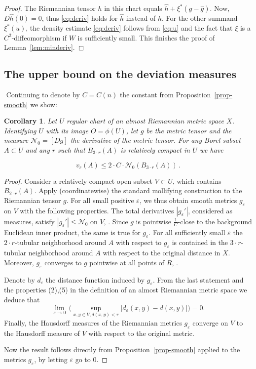 \documentclass[12pt,leqno,intlimits]{amsart}
\numberwithin{equation}{section}
\newtheorem{cor}[thm]{Corollary}
\theoremstyle{definition}
\theoremstyle{remark}
\newcommand{\pref}[1]{Proposition~\ref{#1}}
\newcommand{\lref}[1]{Lemma~\ref{#1}}
\begin{document}
\begin{proof}
The Riemannian tensor $h$ in this chart equals $\hat h +\xi^{\ast } (g-\hat g)$.
Now, $D\hat h (0) =0$, thus
\eqref{eq:deriv} holds for $\hat h$ instead of $h$. For the other summand $\xi ^{\ast} (u)$, the density estimate
\eqref{eq:deriv} follows from \eqref{eq:u} and the fact that $\xi$ is a $C^2$-diffeomorphism
if $W$ is sufficiently small. This finishes the proof of \lref{lem:minderiv}.
\end{proof}


\subsection{The upper bound on the deviation measures}
$ $
%
Continuing to denote by $C=C(n)$ the constant from Proposition~\ref{prop-smooth} we show:

\begin{cor} \label{cor-dc-vr}
Let $U$ regular chart of an almost Riemannian metric space $X$. Identifying $U$ with its image $O=\phi (U)$, let
$g$ be the metric tensor and the measure $\mathcal N_0 =[Dg]$ the derivative of the metric tensor. For any Borel subset $A\subset U$ and any $r$
such that $B_{3{\cdot}r} (A)$ is relatively compact in $U$ we have

\[
v_r (A) \leq 2 \cdot C \cdot \mathcal N_0 (B_{3{\cdot}r} (A))\, .
\]
\end{cor}

\begin{proof}
Consider a relatively compact open subset $ V \subset U$, which contains $B_{2{\cdot}r} (A)$. Apply (coordinatewise) the standard mollifying construction
to the Riemannian tensor $g$. For all small positive $\varepsilon$, we thus obtain smooth metrics $g_{\varepsilon}$ on $V$ with the following properties.
The total derivatives $|g_{\varepsilon} '|$, considered as measures, satisfy $|g_{\varepsilon} '|\leq \mathcal N_0$ on $V$, \cite[Theorem 5.3.1]{Ziemer}. Since $g$ is pointwise $\frac 1 C$-close to the background Euclidean inner product, the same is true for $g_{\varepsilon}$. For all sufficiently small $\varepsilon$ the $2{\cdot}r$-tubular neighborhood around $A$ with respect to $g_{\varepsilon}$ is contained in the $3{\cdot}r$-tubular neighborhood around $A$ with respect to the original distance in $X$. Moreover, $g_{\varepsilon}$ converges to $g$ pointwise at all points of $R$, \cite[Theorem 1.6.1]{Ziemer}.

Denote by $d_{\varepsilon}$ the distance function induced by $g_{\varepsilon}$. From the last statement and the properties (2),(5) in the definition of an almost Riemannian metric space we deduce that
\[
\lim _{\varepsilon \to 0}\, \Big (\sup _{x,y \in V, d(x,y) <r} |d_{\varepsilon} (x,y) -d(x,y)|\Big )=0  .
\]
Finally, the Hausdorff measures of the Riemannian metrics $g_{\varepsilon}$ converge on $V$ to the Hausdorff measure of $V$ with respect to the original metric.

Now the result follows directly from \pref{prop-smooth} applied to the metrics $g_{\varepsilon}$, by letting $\varepsilon$ go to $0$.
\end{proof}
\end{document}
